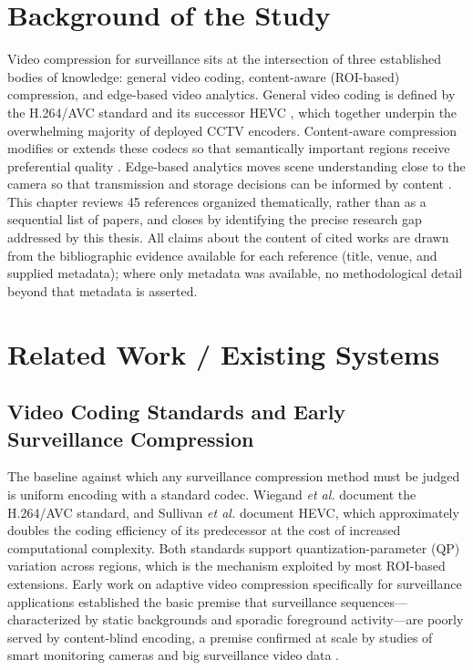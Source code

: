 \section{Background of the Study}

Video compression for surveillance sits at the intersection of three established bodies of knowledge: general video coding, content-aware (ROI-based) compression, and edge-based video analytics. General video coding is defined by the H.264/AVC standard \cite{Wiegand2003H264} and its successor HEVC \cite{Sullivan2012HEVC}, which together underpin the overwhelming majority of deployed CCTV encoders. Content-aware compression modifies or extends these codecs so that semantically important regions receive preferential quality \cite{Huang2009MultiPriority,Xue2016FastROI}. Edge-based analytics moves scene understanding close to the camera so that transmission and storage decisions can be informed by content \cite{Chen2019DIVS,Nguyen2020Scalable}. This chapter reviews 45 references organized thematically, rather than as a sequential list of papers, and closes by identifying the precise research gap addressed by this thesis. All claims about the content of cited works are drawn from the bibliographic evidence available for each reference (title, venue, and supplied metadata); where only metadata was available, no methodological detail beyond that metadata is asserted.

\section{Related Work / Existing Systems}

\subsection{Video Coding Standards and Early Surveillance Compression}

The baseline against which any surveillance compression method must be judged is uniform encoding with a standard codec. Wiegand \textit{et al.} \cite{Wiegand2003H264} document the H.264/AVC standard, and Sullivan \textit{et al.} \cite{Sullivan2012HEVC} document HEVC, which approximately doubles the coding efficiency of its predecessor at the cost of increased computational complexity. Both standards support quantization-parameter (QP) variation across regions, which is the mechanism exploited by most ROI-based extensions. Early work on adaptive video compression specifically for surveillance applications \cite{ISM2011Adaptive} established the basic premise that surveillance sequences---characterized by static backgrounds and sporadic foreground activity---are poorly served by content-blind encoding, a premise confirmed at scale by studies of smart monitoring cameras and big surveillance video data \cite{Shao2018Smart}.

